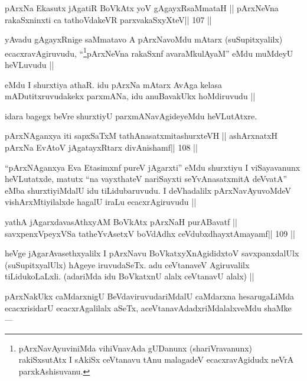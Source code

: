 \begin{shl}
pArxNa Ekasutx jAgatiR BoVkAtx yoV gAgayxRsaMmataH ||
pArxNeVna rakaSxninxti ca tathoVdakeVR parxvakaSxyXteV\hfill || 107 ||
\end{shl}

\begin{artha}
yAvadu gAgayxRnige saMmatavo A pArxNavoMdu mAtarx (suSupitxyalilx) ecacxravAgiruvudu, ``\footnote[12]{pArxNavAyuviniMda vihiVnavAda gUDanunx (shariVravanunx) rakiSxsutAtx I sAkiSx ceVtanavu tAnu malagadeV ecacxravAgidudx neVrA parxkAshisuvanu.}pArxNeVna rakaSxnf avaraMkulAyaM'' eMdu muMdeyU heVLuvudu ||
\end{artha}

\begin{artha}
eMdu I shurxtiya athaR. idu pArxNa mAtarx AvAga kelasa mADutitxruvudakekx parxmANa, idu anuBavakUkx hoMdiruvudu ||
\end{artha}

\begin{artha}
idara bagegx beVre shurxtiyU parxmANavAgideyeMdu heVLutAtxre.
\end{artha} 

\begin{shl}
pArxNAganxya iti sapxSaTxM tathA\s nasatxmitashurxteVH ||
ashArxnatxH pArxNa EvAtoV jAgatayxRtarx divAnishamf\hfill || 108 ||
\end{shl}

\begin{artha}
``pArxNAganxya Eva Etasimxnf pureV jAgarxti'' eMdu shurxtiyu I viSayavanunx heVLutatxde, matutx ``na vayxthateV nariSayxti seYvAnasatxmitA deVvatA'' eMba shurxtiyiMdalU idu tiLidubaruvudu. I deVhadalilx pArxNavAyuvoMdeV vishArxMtiyilalxde hagalU iraLu ecacxrAgiruvudu ||
\end{artha} 

\begin{shl}
yathA jAgarxdavasAthxyAM BoVkAtx pArxNaH purA\s Bavatf ||
savxpenxV\s peyxVSa tatheYvA\s\s setxV boVdAdhx ceVdubxdhayxtAmayamf\hfill || 109 ||
\end{shl}

\begin{artha}
heVge jAgarAvasethxyalilx I pArxNavu BoVkatxyXnAgididxtoV savxpanxdalUlx (suSupitxyalUlx) hAgeye iruvudaSeTx. adu ceVtanaveV Agiruvalilx tiLidukoLaLxli. (adariMda idu BoVkatxnU alalx ceVtanavU alalx) ||
\end{artha}

\begin{artha}
pArxNakUkx caMdarxnigU BeVdaviruvudariMdalU caMdarxna hesarugaLiMda ecacxrisidarU ecacxrAgalilalx aSeTx, aceVtanavAdadxriMdalalxveMdu shaMke --- 
\end{artha} 


